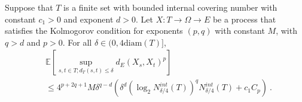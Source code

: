 \begin{theorem}\label{thm:finite_set_bound_of_dist_le_of_le_diam}
  \leanok
Suppose that $T$ is a finite set with bounded internal covering number with constant $c_1>0$ and exponent $d > 0$.
Let $X : T \to \Omega \to E$ be a process that satisfies the Kolmogorov condition for exponents $(p,q)$ with constant $M$, with $q > d$ and $p > 0$.
For all $\delta \in (0, 4\mathrm{diam}(T)]$,
\begin{align*}
  &\mathbb{E}\left[ \sup_{s, t \in T; d_T(s, t) \le \delta} d_E(X_s, X_t)^p \right]
  \\
  &\le 4^{p+2q+1} M \delta^{q-d} \left(\delta^d \left(\log_2 N^{int}_{\delta/4}(T) \right)^q  N^{int}_{\delta/4}(T)
    + c_1 C_p\right)
  \: .
\end{align*}
\end{theorem}

